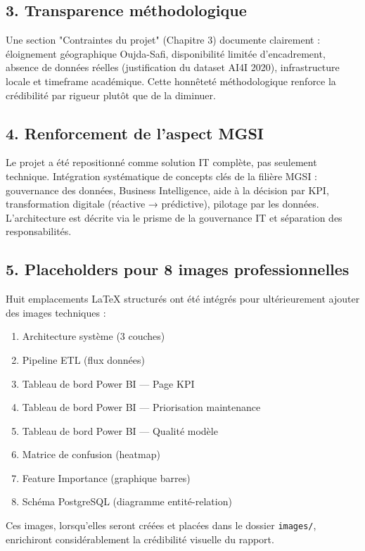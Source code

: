 \documentclass[a4paper,12pt,twoside]{report}
\begin{document}
\subsection*{3. Transparence méthodologique}

Une section "Contraintes du projet" (Chapitre 3) documente clairement : éloignement géographique Oujda-Safi, disponibilité limitée d'encadrement, absence de données réelles (justification du dataset AI4I 2020), infrastructure locale et timeframe académique. Cette honnêteté méthodologique renforce la crédibilité par rigueur plutôt que de la diminuer.

\subsection*{4. Renforcement de l'aspect MGSI}

Le projet a été repositionné comme solution IT complète, pas seulement technique. Intégration systématique de concepts clés de la filière MGSI : gouvernance des données, Business Intelligence, aide à la décision par KPI, transformation digitale (réactive → prédictive), pilotage par les données. L'architecture est décrite via le prisme de la gouvernance IT et séparation des responsabilités.

\subsection*{5. Placeholders pour 8 images professionnelles}

Huit emplacements LaTeX structurés ont été intégrés pour ultérieurement ajouter des images techniques :
\begin{enumerate}
    \item Architecture système (3 couches)
    \item Pipeline ETL (flux données)
    \item Tableau de bord Power BI — Page KPI
    \item Tableau de bord Power BI — Priorisation maintenance
    \item Tableau de bord Power BI — Qualité modèle
    \item Matrice de confusion (heatmap)
    \item Feature Importance (graphique barres)
    \item Schéma PostgreSQL (diagramme entité-relation)
\end{enumerate}

Ces images, lorsqu'elles seront créées et placées dans le dossier \texttt{images/}, enrichiront considérablement la crédibilité visuelle du rapport.
\end{document}
